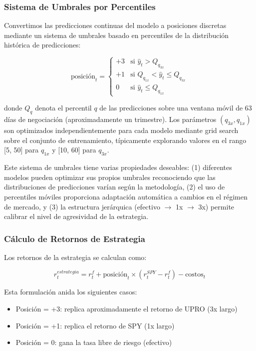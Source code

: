 \documentclass[11pt,a4paper]{article}
\begin{document}
\subsubsection{Sistema de Umbrales por Percentiles}

Convertimos las predicciones continuas del modelo a posiciones discretas mediante un sistema de umbrales basado en percentiles de la distribución histórica de predicciones:

\begin{equation}
\text{posición}_t = \begin{cases}
+3 & \text{si } \hat{y}_t > Q_{q_{3x}} \\
+1 & \text{si } Q_{q_{1x}} < \hat{y}_t \leq Q_{q_{3x}} \\
0 & \text{si } \hat{y}_t \leq Q_{q_{1x}}
\end{cases}
\end{equation}

donde $Q_q$ denota el percentil $q$ de las predicciones sobre una ventana móvil de 63 días de negociación (aproximadamente un trimestre). Los parámetros $(q_{3x}, q_{1x})$ son optimizados independientemente para cada modelo mediante grid search sobre el conjunto de entrenamiento, típicamente explorando valores en el rango [5, 50] para $q_{1x}$ y [10, 60] para $q_{3x}$.

Este sistema de umbrales tiene varias propiedades deseables: (1) diferentes modelos pueden optimizar sus propios umbrales reconociendo que las distribuciones de predicciones varían según la metodología, (2) el uso de percentiles móviles proporciona adaptación automática a cambios en el régimen de mercado, y (3) la estructura jerárquica (efectivo $\rightarrow$ 1x $\rightarrow$ 3x) permite calibrar el nivel de agresividad de la estrategia.

\subsubsection{Cálculo de Retornos de Estrategia}

Los retornos de la estrategia se calculan como:

\begin{equation}
r_t^{estrategia} = r_t^f + \text{posición}_t \times (r_t^{SPY} - r_t^f) - \text{costos}_t
\end{equation}

Esta formulación anida los siguientes casos:
\begin{itemize}[noitemsep]
    \item Posición = +3: replica aproximadamente el retorno de UPRO (3x largo)
    \item Posición = +1: replica el retorno de SPY (1x largo)
    \item Posición = 0: gana la tasa libre de riesgo (efectivo)
\end{itemize}
\end{document}
